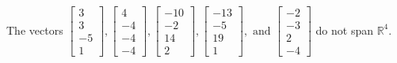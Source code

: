 \begin{exercise}
\begin{exerciseStatement}
  \end{exerciseStatement}
  \begin{exerciseAnswer}
   The vectors \(\left[\begin{array}{r}
3 \\
3 \\
-5 \\
1
\end{array}\right] , \left[\begin{array}{r}
4 \\
-4 \\
-4 \\
-4
\end{array}\right] , \left[\begin{array}{r}
-10 \\
-2 \\
14 \\
2
\end{array}\right] , \left[\begin{array}{r}
-13 \\
-5 \\
19 \\
1
\end{array}\right] , \text{ and } \left[\begin{array}{r}
-2 \\
-3 \\
2 \\
-4
\end{array}\right]\) 
  	 do not  
	span \(\mathbb{R}^4\).
  


  \end{exerciseAnswer}
\end{exercise}